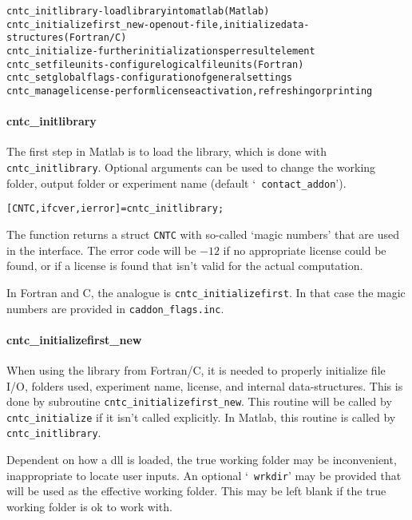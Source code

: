 \documentclass[12pt]{report}
\begin{document}
\begin{alltt}\small
cntc_initlibrary          - load library into matlab (Matlab)
cntc_initializefirst_new  - open out-file, initialize data-structures (Fortran/C)
cntc_initialize           - further initializations per result element
cntc_setfileunits         - configure logical file units (Fortran)
cntc_setglobalflags       - configuration of general settings
cntc_managelicense        - perform license activation, refreshing or printing
\end{alltt}

\paragraph{cntc\_initlibrary}

The first step in Matlab is to load the library, which is done with {\tt
cntc\_\-init\-library}. Optional arguments can be used to change the
working folder, output folder or experiment name (default `{\tt 
contact\_addon}').
\begin{alltt}\small
   [CNTC, ifcver, ierror] = cntc_initlibrary;
\end{alltt}
The function returns a struct {\tt CNTC} with so-called `magic numbers'
that are used in the interface. The error code will be $-12$ if no
appropriate license could be found, or if a license is found that isn't
valid for the actual computation.

In Fortran and C, the analogue is {\tt cntc\_initializefirst}. In that
case the magic numbers are provided in {\tt caddon\_\-flags.\-inc}.

\paragraph{cntc\_initializefirst\_new}

When using the library from Fortran/C, it is needed to properly
initialize file I/O, folders used, experiment name, license, and internal
data-structures. This is done by subroutine {\tt cntc\_initializefirst\_new}.
This routine will be called by {\tt cntc\_initialize} if it isn't called
explicitly. In Matlab, this routine is called by {\tt cntc\_initlibrary}. 

Dependent on how a dll is loaded, the true working folder may be
inconvenient, inappropriate to locate user inputs. An optional `{\tt
wrkdir}' may be provided that will be used as the effective working folder.
This may be left blank if the true working folder is ok to work with.
\end{document}
